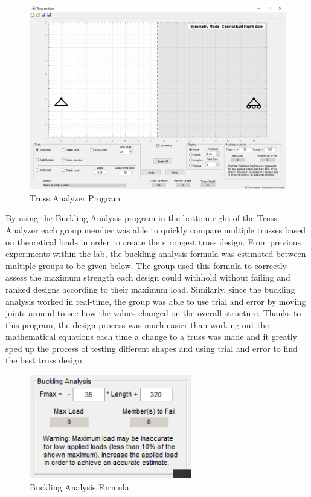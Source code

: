\documentclass{article}
\begin{document}
\begin{figure}[ht]
\caption{Truss Analyzer Program}
\centering
\includegraphics[width=400pt]{TrussAnalyzerProgram.png}
\end{figure}

\newpage

 By using the Buckling Analysis program in the bottom right of the Truss Analyzer each group member was able to quickly compare multiple trusses based on theoretical loads in order to create the strongest truss design. From previous experiments within the lab, the buckling analysis formula was estimated between multiple groups to be given below. The group used this formula to correctly assess the maximum strength each design could withhold without failing and ranked designs according to their maximum load. Similarly, since the buckling analysis worked in real-time, the group was able to use trial and error by moving joints around to see how the values changed on the overall structure. Thanks to this program, the design process was much easier than working out the mathematical equations each time a change to a truss was made and it greatly sped up the process of testing different shapes and using trial and error to find the best truss design. 

\begin{figure}[ht]
\caption{Buckling Analysis Formula}
\centering
\includegraphics[width=200pt]{BucklingAnalysis.png}
\end{figure}
\end{document}
